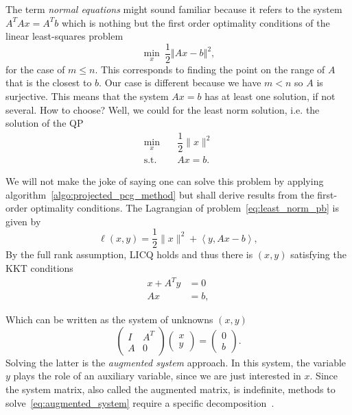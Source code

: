 \documentclass[10pt]{article}
\numberwithin{equation}{section}
\newcommand{\scal}[2]{\left\langle {#1} , {#2} \right\rangle} %
\begin{document}
	 
	 The term \textit{normal equations} might sound familiar because it refers to the system $A^TAx=A^Tb$ which is nothing but the first order optimality conditions of the linear least-squares problem
	 \begin{equation}\label{eq:linear_least_squares}
	 	\min_x\ \dfrac{1}{2} \left\Vert Ax-b\right\Vert^2,
	 \end{equation} 
	 for the case of $m\le n$. This corresponds to finding the point on the range of $A$ that is the closest to $b$. Our case is different because we have $m < n$ so $A$ is surjective. This means that the system $Ax=b$ has at least one solution, if not several. How to choose? Well, we could for the least norm solution, i.e. the solution of the QP
	 \begin{equation}\label{eq:least_norm_pb}
	 	\begin{aligned}
	 		\min_x & \quad \dfrac{1}{2}\|x\|^2 \\
	 		\text{s.t.} & \quad Ax=b.
	 	\end{aligned}
	 \end{equation}
	 
	 We will not make the joke of saying one can solve this problem by applying algorithm~\ref{algo:projected_pcg_method} but shall derive results from the first-order optimality conditions. The Lagrangian of problem~\eqref{eq:least_norm_pb} is given by
	 \[\ell(x,y) = \dfrac{1}{2}\|x\|^2 + \scal{y}{Ax-b},\]
	 By the full rank assumption, LICQ holds and thus there is $(x,y)$ satisfying the KKT conditions
	 \begin{align*}
	 	x + A^Ty &= 0 \\
	 	Ax &= b,
	 \end{align*} 
	 
	 Which can be written as the system of unknowns $(x,y)$
	 \begin{equation}\label{eq:augmented_system}
	 	\begin{pmatrix}
	 	I & A^T \\
	 	A & 0
	 \end{pmatrix} \begin{pmatrix}
	 	x \\ y 
	 \end{pmatrix} = \begin{pmatrix}
	 	0 \\ b
	 \end{pmatrix}.
	 \end{equation}
	 Solving the latter is the \textit{augmented system} approach. In this system, the variable $y$ plays the role of an auxiliary variable, since we are just interested in $x$. Since the system matrix, also called the augmented matrix, is indefinite, methods to solve~\eqref{eq:augmented_system} require a specific decomposition~\cite{golubvanloan:2013}. 
	 
\end{document}
